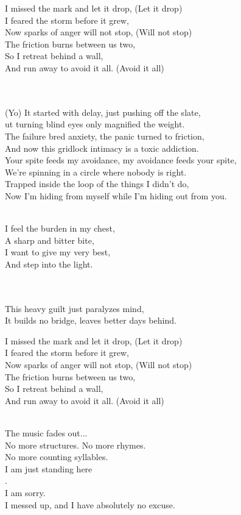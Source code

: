 \begin{lyrics}
I missed the mark and let it drop, (Let it drop)\\
I feared the storm before it grew,\\
Now sparks of anger will not stop, (Will not stop)\\
The friction burns between us two,\\
So I retreat behind a wall,\\
And run away to avoid it all. %
(Avoid it all)

\\
\\
(Yo) It started with delay, just pushing off the slate,\\
ut turning blind eyes only magnified the weight.\\
The failure bred anxiety, the panic turned to friction,\\
And now this gridlock intimacy is a toxic addiction.\\
Your spite feeds my avoidance, my avoidance feeds your spite,\\
We’re spinning in a circle where nobody is right.\\
Trapped inside the loop of the things I didn’t do,\\
Now I’m hiding from myself while I'm hiding out from you.

\\
I feel the burden in my chest,\\
A sharp and bitter bite,\\
I want to give my very best,\\
And step into the light.


\\
\\
This heavy guilt just paralyzes mind,\\
It builds no bridge, leaves better days behind.

I missed the mark and let it drop, (Let it drop)\\
I feared the storm before it grew,\\
Now sparks of anger will not stop, (Will not stop)\\
The friction burns between us two,\\
So I retreat behind a wall,\\
And run away to avoid it all. %
(Avoid it all)

\\
The music fades out...\\
No more structures. %
No more rhymes.\\
No more counting syllables.\\
I am just standing here\\
.\\
I am sorry.\\
I messed up, and I have absolutely no excuse.
\end{lyrics}


